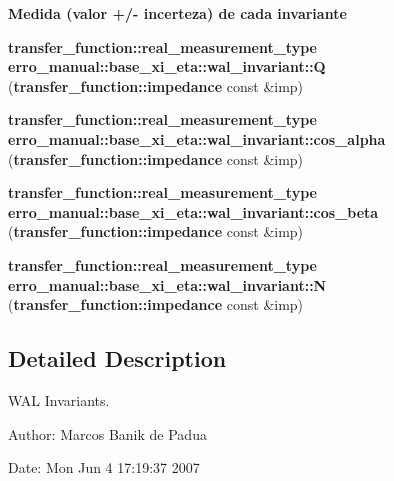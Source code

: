 \begin{Indent}{\bf Medida (valor +/- incerteza) de cada invariante}
\begin{CompactItemize}
\item 
{\bf transfer\_\-function::real\_\-measurement\_\-type} \textbf{erro\_\-manual::base\_\-xi\_\-eta::wal\_\-invariant::Q} ({\bf transfer\_\-function::impedance} const \&imp)\label{namespaceerro__manual_1_1base__xi__eta_1_1wal__invariant_df427fc84f61b58b098369d3c1a0f089}

\item 
{\bf transfer\_\-function::real\_\-measurement\_\-type} \textbf{erro\_\-manual::base\_\-xi\_\-eta::wal\_\-invariant::cos\_\-alpha} ({\bf transfer\_\-function::impedance} const \&imp)\label{namespaceerro__manual_1_1base__xi__eta_1_1wal__invariant_5c6e2a59350c87e4f538f6f05d685493}

\item 
{\bf transfer\_\-function::real\_\-measurement\_\-type} \textbf{erro\_\-manual::base\_\-xi\_\-eta::wal\_\-invariant::cos\_\-beta} ({\bf transfer\_\-function::impedance} const \&imp)\label{namespaceerro__manual_1_1base__xi__eta_1_1wal__invariant_1893a461a19396fadb0fcc0c7904de5c}

\item 
{\bf transfer\_\-function::real\_\-measurement\_\-type} \textbf{erro\_\-manual::base\_\-xi\_\-eta::wal\_\-invariant::N} ({\bf transfer\_\-function::impedance} const \&imp)\label{namespaceerro__manual_1_1base__xi__eta_1_1wal__invariant_e74e6f334054fb99672ecc7110f9b271}

\end{CompactItemize}
\end{Indent}


\subsection{Detailed Description}
WAL Invariants. 

\begin{Desc}
\item[Author:]Marcos Banik de Padua \end{Desc}
\begin{Desc}
\item[Date:]Mon Jun 4 17:19:37 2007 \end{Desc}
